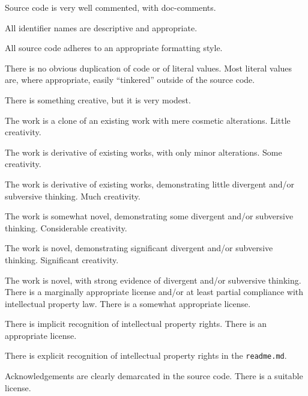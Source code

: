 \documentclass{../../fal_assignment}
\begin{document}
\begin{markingrubric}
        \grade Source code is very well commented, with doc-comments.
            \par All identifier names are descriptive and appropriate.
            \par All source code adheres to an appropriate formatting style.
             \par There is no obvious duplication of code or of literal values. Most literal values are, where appropriate, easily ``tinkered'' outside of the source code.  
%
\end{markingrubric}

\begin{markingrubric}
%
        \grade\fail There is something creative, but it is very modest.
            \par The work is a clone of an existing work with mere cosmetic alterations.
        \grade Little creativity.
            \par The work is derivative of existing works, with only minor alterations.
        \grade Some creativity.
            \par The work is derivative of existing works, demonstrating little divergent and/or subversive thinking.
        \grade Much creativity.
            \par The work is somewhat novel, demonstrating some divergent and/or subversive thinking.
        \grade Considerable creativity.
            \par The work is novel, demonstrating significant divergent and/or subversive thinking.
        \grade Significant creativity.
            \par The work is novel, with strong evidence of divergent and/or subversive thinking.
%
        \grade\fail There is a marginally appropriate license and/or at least partial compliance with intellectual property law.
        \grade There is a somewhat appropriate license.
            \par There is implicit recognition of intellectual property rights.
        \grade There is an appropriate license. 
            \par There is explicit recognition of intellectual property rights in the \texttt{readme.md}.
            \par Acknowledgements are clearly demarcated in the source code.
        \grade There is a suitable license.

\end{markingrubric}
\end{document}
